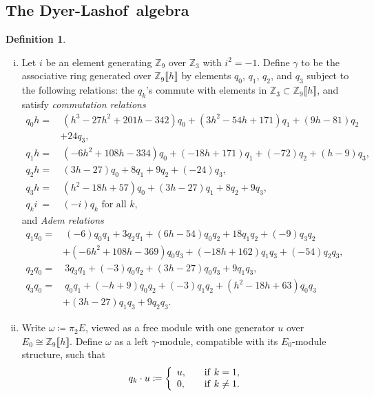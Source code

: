 \documentclass{gtpart}
\theoremstyle{definition}
\newtheorem{defn}[thm]{Definition}
\theoremstyle{remark}
\newcommand{\mb}[1]{\mathbb{#1}}
\newcommand{\DL}{Dyer-Lashof~}
\newcommand{\BZ}{{\mb Z}}
\newcommand{\g}{\gamma}
\begin{document}
\subsection{The \DL algebra}

\begin{defn}
\label{def:go}
 \mbox{}
 \begin{enumerate}[(i)]
  \item \label{go(i)} Let $i$ be an element generating $\BZ_9$ over 
  $\BZ_3$ with $i^2 = -1$.  Define $\g$ to be the associative ring 
  generated over $\BZ_9 \llbracket h \rrbracket$ by elements $q_0$, 
  $q_1$, $q_2$, and $q_3$ subject to the following relations: the 
  $q_k$'s commute with elements in 
  $\BZ_3 \subset \BZ_9 \llbracket h \rrbracket$, and satisfy {\em 
  commutation relations} 
  \begin{equation*}
  \begin{split}
   q_0 h = & ~ (h^3 - 27 h^2 + 201 h - 342) q_0 + (3 h^2 - 54 h + 171) q_1 + (9 h - 81) q_2 \\
           & + 24 q_3, \\
   q_1 h = & ~ (-6 h^2 + 108 h - 334) q_0 + (-18 h + 171) q_1 + (-72) q_2 + (h - 9) q_3, \\
   q_2 h = & ~ (3 h - 27) q_0 + 8 q_1 + 9 q_2 + (-24) q_3, \\
   q_3 h = & ~ (h^2 - 18 h + 57) q_0 + (3 h - 27) q_1 + 8 q_2 + 9 q_3, \\
   q_k i ~ = & ~ (-i) q_k \text{~for all~} k, 
  \end{split}
  \end{equation*}
  and {\em Adem relations} 
  \begin{equation*}
  \begin{split}
   q_1q_0 = & ~ (-6) q_0q_1 + 3 q_2q_1 + (6 h - 54) q_0q_2 + 18 q_1q_2 + (-9) q_3q_2 \\
            & + (-6 h^2 + 108 h - 369) q_0q_3 + (-18 h + 162) q_1q_3 + (-54) q_2q_3, \quad~~ \\
   q_2q_0 = & ~ 3 q_3q_1 + (-3) q_0q_2 + (3 h - 27) q_0q_3 + 9 q_1q_3, \\
   q_3q_0 = & ~ q_0q_1 + (-h + 9) q_0q_2 + (-3) q_1q_2 + (h^2 - 18 h + 63) q_0q_3 \\
            & + (3 h - 27) q_1q_3 + 9 q_2q_3.  
  \end{split}
  \end{equation*}

  \item \label{go(ii)} Write $\omega \coloneqq \pi_2 E$, viewed as a 
  free module with one generator $u$ over 
  $E_0 \cong \BZ_9 \llbracket h \rrbracket$.  Define $\omega$ as a left 
  $\g$-module, compatible with its $E_0$-module structure, such that 
  \[
   q_k \cdot u \coloneqq \left\{
   \begin{array}{ll}
     u,  & \quad {\rm if}~k = 1, \\
     0,  & \quad {\rm if}~k \neq 1.  
   \end{array}
   \right.
  \]
 \end{enumerate}
\end{defn}
\end{document}
